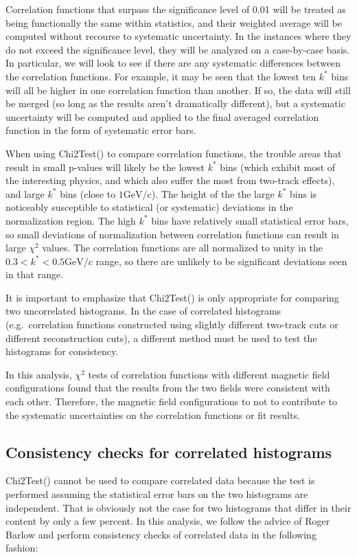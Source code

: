 Correlation functions that surpass the significance level of 0.01 will be treated as being functionally the same within statistics, and their weighted average will be computed without recourse to systematic uncertainty. 
In the instances where they do not exceed the significance level, they will be analyzed on a case-by-case basis.  
In particular, we will look to see if there are any systematic differences between the correlation functions.  
For example, it may be seen that the lowest ten $k^*$ bins will all be higher in one correlation function than another.  
If so, the data will still be merged (so long as the results aren't dramatically different), but a systematic uncertainty will be computed and applied to the final averaged correlation function in the form of systematic error bars.  

When using Chi2Test() to compare correlation functions, the trouble areas that result in small p-values will likely be the lowest $k^*$ bins (which exhibit most of the interesting physics, and which also suffer the most from two-track effects), and large $k^*$ bins (close to $1 \mathrm{GeV/c}$).  
The height of the the large $k^*$ bins is noticeably susceptible to statistical (or systematic) deviations in the normalization region.  
The high $k^*$ bins have relatively small statistical error bars, so small deviations of normalization between correlation functions can result in large $\chi^2$ values.  
The correlation functions are all normalized to unity in the $0.3 < k^* < 0.5 \mathrm{GeV}/c$ range, so there are unlikely to be significant deviations seen in that range.  

It is important to emphasize that Chi2Test() is only appropriate for comparing two uncorrelated histograms.  
In the case of correlated histograms (e.g.\ correlation functions constructed using slightly different two-track cuts or different reconstruction cuts), a different method must be used to test the histograms for consistency. 

In this analysis, $\chi^2$ tests of correlation functions with different magnetic field configurations found that the results from the two fields were consistent with each other.
Therefore, the magnetic field configurations to not to contribute to the systematic uncertainties on the correlation functions or fit results. 


\subsection{Consistency checks for correlated histograms}
\label{sec:ConsistencyCheckCorrelated}
Chi2Test() cannot be used to compare correlated data because the test is performed assuming the statistical error bars on the two histograms are independent.  
That is obviously not the case for two histograms that differ in their content by only a few percent.  
In this analysis, we follow the advice of Roger Barlow \cite{Barlow:2002yb} and perform consistency checks of correlated data in the following fashion:

